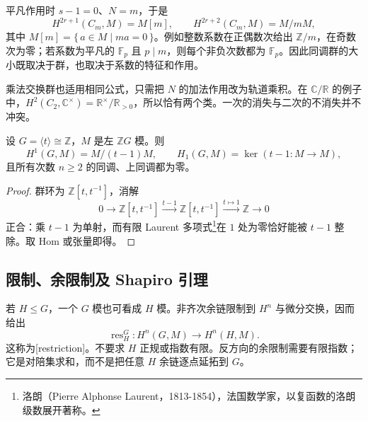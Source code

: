 平凡作用时 \(s-1=0\)、\(N=m\)，于是
\[
H^{2r+1}(C_m,M)=M[m],\qquad H^{2r+2}(C_m,M)=M/mM,
\]
其中 \(M[m]=\{\,a\in M\mid ma=0\,\}\)。例如整数系数在正偶数次给出 \(\mathbb Z/m\)，在奇数次为零；若系数为平凡的 \(\mathbb F_p\) 且 \(p\mid m\)，则每个非负次数都为 \(\mathbb F_p\)。因此同调群的大小既取决于群，也取决于系数的特征和作用。

\ProseParagraphBreak
乘法交换群也适用相同公式，只需把 \(N\) 的加法作用改为轨道乘积。在 \(\mathbb C/\mathbb R\) 的例子中，\(H^2(C_2,\mathbb C^\times)=\mathbb R^\times/\mathbb R_{>0}\)，所以恰有两个类。一次的消失与二次的不消失并不冲突。

\begin{proposition}\label{b4:prop:infinite-cyclic-cohomology}
设 \(G=\langle t\rangle\cong\mathbb Z\)，\(M\) 是左 \(\mathbb ZG\) 模。则
\[
H^1(G,M)=M/(t-1)M,\qquad H_1(G,M)=\ker(t-1:M\to M),
\]
且所有次数 \(n\ge2\) 的同调、上同调都为零。
\end{proposition}
\begin{proof}
群环为 \(\mathbb Z[t,t^{-1}]\)，消解
\[
0\longrightarrow\mathbb Z[t,t^{-1}]
\xrightarrow{t-1}\mathbb Z[t,t^{-1}]
\xrightarrow{t\mapsto1}\mathbb Z\longrightarrow0
\]
正合：乘 \(t-1\) 为单射，而有限 Laurent 多项式\footnote{洛朗（Pierre Alphonse Laurent，1813-1854），法国数学家，以复函数的洛朗级数展开著称。}在 \(1\) 处为零恰好能被 \(t-1\) 整除。取 Hom 或张量即得。
\end{proof}

\subsection{限制、余限制及 Shapiro 引理}
\label{b4:subsec:1103:02}

若 \(H\le G\)，一个 \(G\) 模也可看成 \(H\) 模。非齐次余链限制到 \(H^n\) 与微分交换，因而给出
\[
\operatorname{res}_H^G:H^n(G,M)\longrightarrow H^n(H,M).
\]
这称为[restriction]。不要求 \(H\) 正规或指数有限。反方向的余限制需要有限指数；它是对陪集求和，而不是把任意 \(H\) 余链逐点延拓到 \(G\)。

